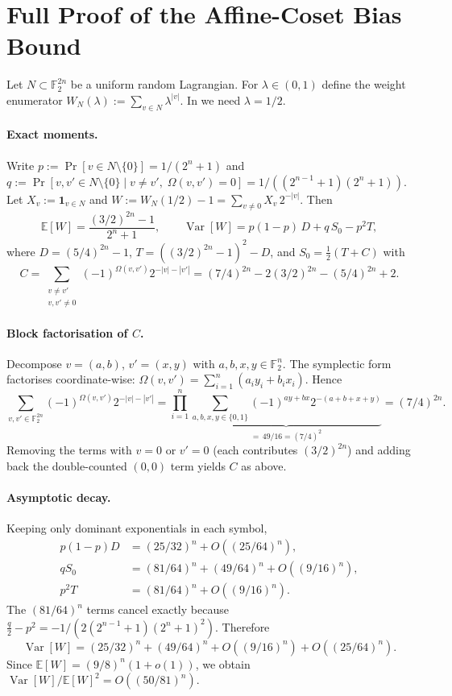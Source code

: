 \documentclass[11pt,a4paper]{article}
\theoremstyle{plain}
\theoremstyle{definition}
\newcommand{\F}{\mathbb{F}}
\newcommand{\E}{\mathbb{E}}
\DeclareMathOperator{\Var}{Var}
\begin{document}
\section{Full Proof of the Affine-Coset Bias Bound}
\label{app:krawtchouk}

Let $N \subset \F_2^{2n}$ be a uniform random Lagrangian.  For $\lambda \in (0,1)$ define the weight enumerator $W_N(\lambda) := \sum_{v \in N} \lambda^{|v|}$.  In  we need $\lambda=1/2$.

\paragraph{Exact moments.}  Write $p := \Pr[v \in N \setminus \{0\}] = 1/(2^n+1)$ and $q := \Pr[v,v' \in N \setminus \{0\} \mid v \neq v',\; \Omega(v,v')=0] = 1/((2^{n-1}+1)(2^n+1))$.  Let $X_v := \mathbf{1}_{v \in N}$ and $W := W_N(1/2)-1 = \sum_{v \neq 0} X_v\,2^{-|v|}$.  Then
\[
\E[W] = \frac{(3/2)^{2n}-1}{2^n+1}, \qquad
\Var[W] = p(1-p)\,D + q\,S_0 - p^2 T,
\]
where $D = (5/4)^{2n}-1$, $T = ((3/2)^{2n}-1)^2-D$, and $S_0 = \tfrac12(T+C)$ with
\[
C = \sum_{\substack{v\neq v'\\ v,v'\neq 0}} (-1)^{\Omega(v,v')}2^{-|v|-|v'|}
  = (7/4)^{2n} - 2(3/2)^{2n} - (5/4)^{2n} + 2.
\]

\paragraph{Block factorisation of $C$.}  Decompose $v=(a,b)$, $v'=(x,y)$ with $a,b,x,y \in \F_2^n$.  The symplectic form factorises coordinate-wise: $\Omega(v,v') = \sum_{i=1}^n (a_i y_i + b_i x_i)$.  Hence
\[
\sum_{v,v' \in \F_2^{2n}} (-1)^{\Omega(v,v')} 2^{-|v|-|v'|}
= \prod_{i=1}^n \underbrace{\sum_{a,b,x,y\in\{0,1\}} (-1)^{ay+bx} 2^{-(a+b+x+y)}}_{=\,49/16 = (7/4)^2}
= (7/4)^{2n}.
\]
Removing the terms with $v=0$ or $v'=0$ (each contributes $(3/2)^{2n}$) and adding back the double-counted $(0,0)$ term yields $C$ as above.

\paragraph{Asymptotic decay.}  Keeping only dominant exponentials in each symbol,
\begin{align*}
p(1-p)D &= (25/32)^n + O((25/64)^n), \\
qS_0 &= (81/64)^n + (49/64)^n + O((9/16)^n), \\
p^2T &= (81/64)^n + O((9/16)^n).
\end{align*}
The $(81/64)^n$ terms cancel exactly because $\tfrac{q}{2}-p^2 = -1/(2(2^{n-1}+1)(2^n+1)^2)$.  Therefore
\[
\Var[W] = (25/32)^n + (49/64)^n + O((9/16)^n) + O((25/64)^n).
\]
Since $\E[W] = (9/8)^n(1+o(1))$, we obtain $\Var[W]/\E[W]^2 = O((50/81)^n)$.
\end{document}
